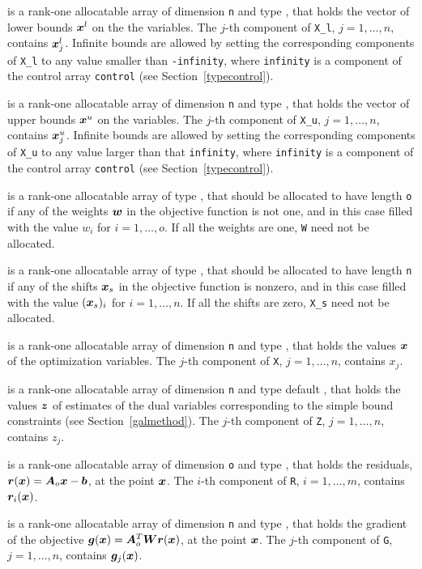 \documentclass{galahad}
\begin{document}
\begin{description}
 is a rank-one allocatable array of dimension {\tt n} and type
\realdp, that holds
the vector of lower bounds ${\bm{x}}^{l}$ on the the variables.
The $j$-th component of {\tt X\_l}, $j = 1, \ldots , n$,
contains ${\bm{x}}_{j}^{l}$.
Infinite bounds are allowed by setting the corresponding
components of {\tt X\_l} to any value smaller than {\tt -infinity},
where {\tt infinity} is a component of the control array {\tt control}
(see Section~\ref{typecontrol}).

 is a rank-one allocatable array of dimension {\tt n} and type
\realdp, that holds
the vector of upper bounds ${\bm{x}}^{u}$ on the variables.
The $j$-th component of {\tt X\_u}, $j = 1, \ldots , n$,
contains ${\bm{x}}_{j}^{u}$.
Infinite bounds are allowed by setting the corresponding
components of {\tt X\_u} to any value larger than that {\tt infinity},
where {\tt infinity} is a component of the control array {\tt control}
(see Section~\ref{typecontrol}).

 is a rank-one allocatable array of type \realdp, that should
be allocated to have length {\tt o} if any of the weights ${\bm{w}}$
in the objective function is not one, and in this case
filled with the value $w_{i}$ for $i = 1, \ldots , o$.
If all the weights are one, {\tt W} need not be allocated.

 is a rank-one allocatable array of type \realdp, that should
be allocated to have length {\tt n} if any of the shifts ${\bm{x}}_s$
in the objective function is nonzero, and in this case
filled with the value $({\bm{x}}_s)_{i}$ for $i = 1, \ldots , n$.
If all the shifts are zero, {\tt X\_s} need not be allocated.

 is a rank-one allocatable array of dimension {\tt n} and type
\realdp,
that holds the values ${\bm{x}}$ of the optimization variables.
The $j$-th component of {\tt X}, $j = 1,  \ldots , n$, contains $x_{j}$.

 is a rank-one allocatable array of dimension {\tt n} and type default
\realdp, that holds
the values ${\bm{z}}$ of estimates  of the dual variables
corresponding to the simple bound constraints (see Section~\ref{galmethod}).
The $j$-th component of {\tt Z}, $j = 1,  \ldots ,  n$, contains $z_{j}$.

 is a rank-one allocatable array of dimension {\tt o} and type
\realdp, that holds the residuals, ${\bm{r}}({\bm{x}}) = {\bm{A}}_o {\bm{x}} - {\bm{b}}$,
at the point ${\bm{x}}$. The $i$-th component of
{\tt R}, $i = 1, \ldots, m$, contains ${\bm{r}}_{i}({\bm{x}})$.

 is a rank-one allocatable array of dimension {\tt n} and type
\realdp, that holds the gradient of the objective
 ${\bm{g}}({\bm{x}}) = {\bm{A}}_o^T {\bm{W}} {\bm{r}}({\bm{x}})$, at the point ${\bm{x}}$. 
The $j$-th component of {\tt G}, $j = 1, \ldots, n$, contains ${\bm{g}}_{j}({\bm{x}})$.


\end{description}
\end{document}
